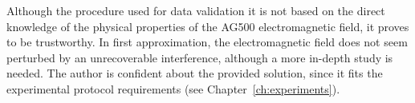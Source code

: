 Although the procedure used for data validation it is not based on the direct 
knowledge of the physical properties of the AG500 electromagnetic field, it 
proves to be trustworthy.
In first approximation, the electromagnetic field does not seem perturbed 
by an unrecoverable interference, although a more in-depth study is needed.
The author is confident about the provided solution, since it fits 
the experimental protocol requirements (see Chapter~\ref{ch:experiments}).
